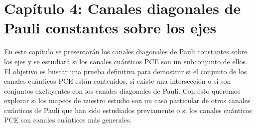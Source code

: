 \section*{Capítulo 4: Canales diagonales de Pauli constantes 
sobre los ejes}
En este capítulo se presentarán los canales diagonales de Pauli constantes 
sobre los ejes \cite{nathanson2007pauli} y se estudiará si los canales
cuánticos PCE son un subconjunto de ellos. El objetivo es buscar una 
prueba definitiva para demostrar si el conjunto de los canales 
cuánticos PCE están contenidos, si existe una intersección o 
si son conjuntos excluyentes con los canales diagonales de Pauli.
Con esto queremos explorar si los mapeos de nuestro estudio 
son un caso particular de otros canales cuánticos de Pauli que 
han sido estudiados previamente o si los canales cuánticos PCE 
son canales cuánticos más generales.